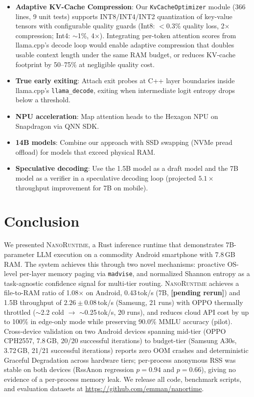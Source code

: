 \documentclass[11pt]{article}
\newcommand{\nanort}{\textsc{NanoRuntime}}
\begin{document}
\begin{itemize}
  \item \textbf{Adaptive KV-Cache Compression}: Our \texttt{KvCacheOptimizer}
    module (366 lines, 9 unit tests) supports INT8/INT4/INT2 quantization of
    key-value tensors with configurable quality guards (Int8: $<$0.3\% quality
    loss, 2$\times$ compression; Int4: $\sim$1\%, 4$\times$). Integrating
    per-token attention scores from llama.cpp's decode loop would enable
    adaptive compression that doubles usable context length under the same
    RAM budget, or reduces KV-cache footprint by 50--75\% at negligible
    quality cost.
  \item \textbf{True early exiting}: Attach exit probes at C++ layer
    boundaries inside llama.cpp's \texttt{llama\_decode}, exiting when
    intermediate logit entropy drops below a threshold.
  \item \textbf{NPU acceleration}: Map attention heads to the Hexagon
    NPU on Snapdragon via QNN SDK.
  \item \textbf{14B models}: Combine our approach with SSD swapping
    (NVMe pread offload) for models that exceed physical RAM.
  \item \textbf{Speculative decoding}: Use the 1.5B model as a draft
    model and the 7B model as a verifier in a speculative decoding loop
    (projected $5.1\times$ throughput improvement for 7B on mobile).
\end{itemize}

\section{Conclusion}
\label{sec:conclusion}

We presented \nanort{}, a Rust inference runtime that demonstrates
7B-parameter LLM execution on a commodity Android smartphone with
7.8\,GB RAM. The system achieves this through two novel mechanisms:
proactive OS-level per-layer memory paging via \texttt{madvise}, and
normalized Shannon entropy as a task-agnostic confidence signal for
multi-tier routing.
%
\nanort{} achieves a file-to-RAM ratio of 1.08$\times$ on Android,
0.43\,tok/s (7B, \textbf{[pending rerun]}) and 1.5B throughput of
$2.26\pm0.08$\,tok/s (Samsung, 21 runs) with OPPO thermally throttled
($\sim$2.2 cold $\to$ $\sim$0.25\,tok/s, 20 runs), and reduces cloud API cost by
up to 100\% in edge-only mode while preserving 90.0\% MMLU accuracy (pilot).
Cross-device validation on two Android devices spanning mid-tier
(OPPO CPH2557, 7.8\,GB, 20/20 successful iterations)
to budget-tier (Samsung A30s, 3.72\,GB, 21/21 successful iterations) reports
zero OOM crashes and deterministic Graceful Degradation across hardware tiers;
per-process anonymous RSS was stable on both devices (RssAnon regression
$p{=}0.94$ and $p{=}0.66$), giving no evidence of a per-process memory leak.
%
We release all code, benchmark scripts, and evaluation datasets
at \url{https://github.com/emman/nanortime}.
\end{document}

